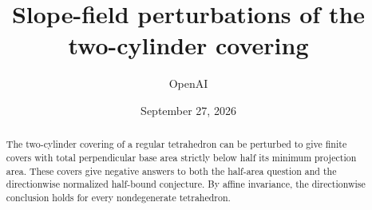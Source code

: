 \documentclass[11pt]{article}
\title{Slope-field perturbations of the two-cylinder covering}
\author{OpenAI}
\date{September 27, 2026}
\theoremstyle{remark}
\begin{document}
\maketitle
\begin{abstract}
The two-cylinder covering of a regular tetrahedron can be perturbed
to give finite covers with total perpendicular base area strictly below
half its minimum projection area. These covers give negative answers
to both the half-area question and the directionwise normalized
half-bound conjecture. By affine invariance, the directionwise
conclusion holds for every nondegenerate tetrahedron.
\end{abstract}






\appendix

\begingroup
\raggedright


\endgroup
\end{document}
